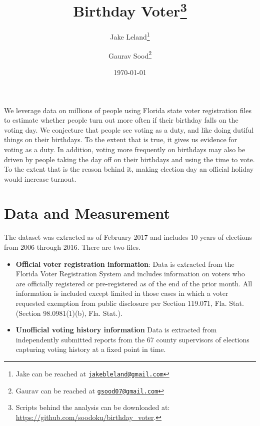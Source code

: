 \documentclass[12pt, letterpaper]{article}
\title{\Large{Birthday Voter}\footnote{Scripts behind the analysis can be downloaded at: \url{https://github.com/soodoku/birthday_voter}.}}
\author{Jake Leland\thanks{Jake can be reached at \href{mailto:jake.leland@utexas.edu}{\footnotesize{\texttt{jakebleland@gmail.com}}}}
\and Gaurav Sood\thanks{Gaurav can be reached at \href{mailto:gsood07@gmail.com}{\footnotesize{\texttt{gsood07@gmail.com}}}}}
\date{\vspace{.5cm}\normalsize{\today}}
\begin{document}
\maketitle

\begin{abstract}

\end{abstract}

\clearpage
\doublespacing
We leverage data on millions of people using Florida state voter registration files to estimate whether people turn out more often if their birthday falls on the voting day. We conjecture that people see voting as a duty, and like doing dutiful things on their birthdays. To the extent that is true, it gives us evidence for voting as a duty. In addition, voting more frequently on birthdays may also be driven by people taking the day off on their birthdays and using the time to vote. To the extent that is the reason behind it, making election day an official holiday would increase turnout.

\section{Data and Measurement}
The dataset was extracted as of February 2017 and includes 10 years of elections from 2006 through 2016. There are two files.

\begin{itemize}
	\item \textbf{Official voter registration information}: Data is extracted from the Florida Voter Registration System and includes information on voters who are officially registered or pre-registered as of the end of the prior month. All information is included except limited in those cases in which a voter requested exemption from public disclosure per Section 119.071, Fla. Stat.  (Section 98.0981(1)(b), Fla. Stat.).

	\item \textbf{Unofficial voting history information} Data is extracted from independently submitted reports from the 67 county supervisors of elections capturing voting history at a fixed point in time. 
\end{itemize}
\end{document}
